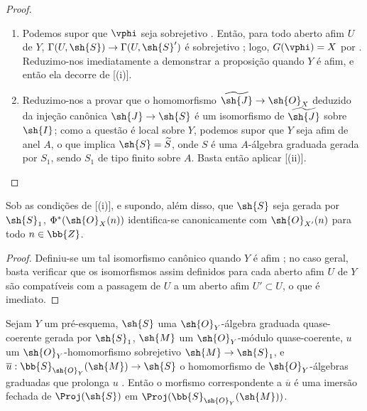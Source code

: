 \documentclass[oneside,10pt]{amsart}
\makeatletter
\newcommand{\ega@arrow}[2]{\mathchoice{#1}{#2}{#2}{#2}}
\renewcommand{\to}{\ega@arrow{\longrightarrow}{\rightarrow}}
\let\EGAOriginalLabel\label
\renewcommand{\label}[1]{\phantomsection\EGAOriginalLabel{#1}}
\makeatother
\begin{document}
\begin{proof}
\medskip\noindent
\begin{enumerate}
  \item[(i)] Podemos supor que $\vphi$ seja sobrejetivo .
    Então, para todo aberto afim $U$ de $Y$, $\Gamma(U,\sh{S})\to\Gamma(U,\sh{S}')$ é sobrejetivo ; logo, $G(\vphi)=X$ por .
    Reduzimo-nos imediatamente a demonstrar a proposição quando $Y$ é afim, e então ela decorre de [(i)].
  \item[(ii)] Reduzimo-nos a provar que o homomorfismo $\widetilde{\sh{J}}\to\sh{O}_X$ deduzido da injeção canônica $\sh{J}\to\sh{S}$ é um isomorfismo de $\widetilde{\sh{J}}$ sobre $\sh{I}$;
    como a questão é local sobre $Y$, podemos supor que $Y$ seja afim de anel $A$, o que implica $\sh{S}=\widetilde{S}$, onde $S$ é uma $A$-álgebra graduada gerada por $S_1$, sendo $S_1$ de tipo finito sobre $A$.
    Basta então aplicar [(ii)].
\end{enumerate}
\end{proof}

\begin{corollary}[3.6.3]
\label{II.3.6.3}
Sob as condições de [(i)], e supondo, além disso, que $\sh{S}$ seja gerada por $\sh{S}_1$, $\Phi^*(\sh{O}_X(n))$ identifica-se canonicamente com $\sh{O}_{X'}(n)$ para todo $n\in\bb{Z}$.
\end{corollary}

\begin{proof}
Definiu-se um tal isomorfismo canônico quando $Y$ é afim ;
no caso geral, basta verificar que os isomorfismos assim definidos para cada aberto afim $U$ de $Y$ são compatíveis com a passagem de $U$ a um aberto afim $U'\subset U$, o que é imediato.
\end{proof}

\begin{corollary}[3.6.4]
\label{II.3.6.4}
Sejam $Y$ um pré-esquema, $\sh{S}$ uma $\sh{O}_Y$-álgebra graduada quase-coerente gerada por $\sh{S}_1$, $\sh{M}$ um $\sh{O}_Y$-módulo quase-coerente, $u$ um $\sh{O}_Y$-homomorfismo sobrejetivo $\sh{M}\to\sh{S}_1$, e $\overline{u}:\bb{S}_{\sh{O}_Y}(\sh{M})\to\sh{S}$ o homomorfismo de $\sh{O}_Y$-álgebras graduadas que prolonga $u$ .
Então o morfismo correspondente a $\overline{u}$ é uma imersão fechada de $\Proj(\sh{S})$ em $\Proj(\bb{S}_{\sh{O}_Y}(\sh{M}))$.
\end{corollary}
\end{document}
